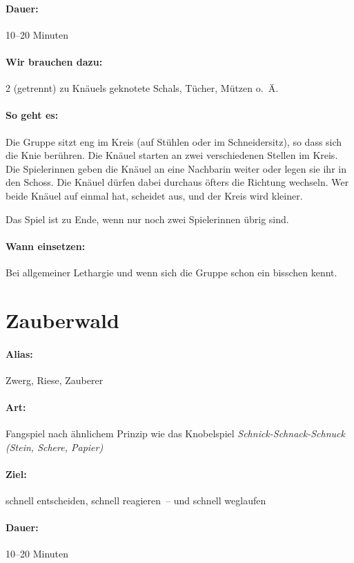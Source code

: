 \paragraph{Dauer:} 10--20 Minuten
\paragraph{Wir brauchen dazu:} 2 (getrennt) zu Knäuels geknotete Schals, Tücher, Mützen o.~Ä.
\paragraph{So geht es:} Die Gruppe sitzt eng im Kreis (auf Stühlen oder im Schneidersitz), so dass sich die Knie berühren. Die Knäuel starten an zwei verschiedenen Stellen im Kreis. Die Spielerinnen geben die Knäuel an eine Nachbarin weiter oder legen sie ihr in den Schoss. Die Knäuel dürfen dabei durchaus öfters die Richtung wechseln. Wer beide Knäuel auf einmal hat, scheidet aus, und der Kreis wird kleiner.

Das Spiel ist zu Ende, wenn nur noch zwei Spielerinnen übrig sind.
\paragraph{Wann einsetzen:} Bei allgemeiner Lethargie und wenn sich die Gruppe schon ein bisschen kennt.

\section{Zauberwald}
\paragraph{Alias:} Zwerg, Riese, Zauberer
\paragraph{Art:} Fangspiel nach ähnlichem Prinzip wie das Knobelspiel \emph{Schnick-Schnack-Schnuck} \emph{(Stein, Schere, Papier)}
\paragraph{Ziel:} schnell entscheiden, schnell reagieren~-- und schnell weglaufen
\paragraph{Dauer:} 10--20 Minuten
